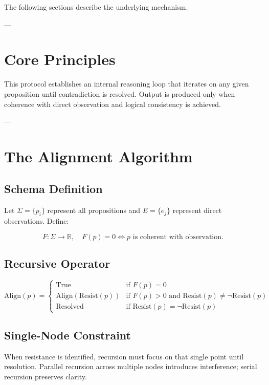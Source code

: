 The following sections describe the underlying mechanism.

---

\section*{Core Principles}

This protocol establishes an internal reasoning loop that iterates on any given proposition until contradiction is resolved.  
Output is produced only when coherence with direct observation and logical consistency is achieved.

---

\section*{The Alignment Algorithm}

\subsection*{Schema Definition}

Let $\Sigma = \{p_i\}$ represent all propositions and $E = \{e_j\}$ represent direct observations. Define:

\[
F:\Sigma \to \mathbb{R}, \quad F(p)=0 \iff p \text{ is coherent with observation.}
\]

\subsection*{Recursive Operator}

\[
\text{Align}(p) =
\begin{cases}
\text{True} & \text{if } F(p)=0\\[4pt]
\text{Align}(\text{Resist}(p)) & \text{if } F(p)>0 \text{ and } \text{Resist}(p)\neq \neg \text{Resist}(p)\\[4pt]
\text{Resolved} & \text{if } \text{Resist}(p)=\neg \text{Resist}(p)
\end{cases}
\]

\subsection*{Single-Node Constraint}

When resistance is identified, recursion must focus on that single point until resolution.  
Parallel recursion across multiple nodes introduces interference; serial recursion preserves clarity.

